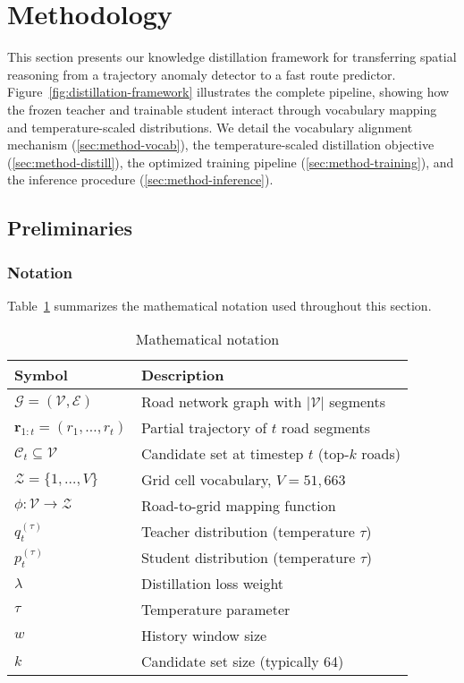 \section{Methodology}
\label{sec:methodology}

This section presents our knowledge distillation framework for transferring spatial reasoning from a trajectory anomaly detector to a fast route predictor. Figure~\ref{fig:distillation-framework} illustrates the complete pipeline, showing how the frozen teacher and trainable student interact through vocabulary mapping and temperature-scaled distributions. We detail the vocabulary alignment mechanism (\autoref{sec:method-vocab}), the temperature-scaled distillation objective (\autoref{sec:method-distill}), the optimized training pipeline (\autoref{sec:method-training}), and the inference procedure (\autoref{sec:method-inference}).

\subsection{Preliminaries}
\label{sec:method-prelim}

\subsubsection{Notation}
Table~\ref{tab:notation} summarizes the mathematical notation used throughout this section.

\begin{table}[h]
\centering
\caption{Mathematical notation}
\label{tab:notation}
\small
\begin{tabular}{ll}
\toprule
\textbf{Symbol} & \textbf{Description} \\
\midrule
$\mathcal{G} = (\mathcal{V}, \mathcal{E})$ & Road network graph with $|\mathcal{V}|$ segments \\
$\mathbf{r}_{1:t} = (r_1, \ldots, r_t)$ & Partial trajectory of $t$ road segments \\
$\mathcal{C}_t \subseteq \mathcal{V}$ & Candidate set at timestep $t$ (top-$k$ roads) \\
$\mathcal{Z} = \{1, \ldots, V\}$ & Grid cell vocabulary, $V = 51{,}663$ \\
$\phi: \mathcal{V} \rightarrow \mathcal{Z}$ & Road-to-grid mapping function \\
$q_t^{(\tau)}$ & Teacher distribution (temperature $\tau$) \\
$p_t^{(\tau)}$ & Student distribution (temperature $\tau$) \\
$\lambda$ & Distillation loss weight \\
$\tau$ & Temperature parameter \\
$w$ & History window size \\
$k$ & Candidate set size (typically 64) \\
\bottomrule
\end{tabular}
\end{table}


